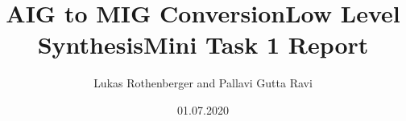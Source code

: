 \documentclass[
	accentcolor=1c,%
	type=intern,
	marginpar=false,
	ruledheaders=section,
	class=report,
	BCOR=5mm,
      parskip=half-,
	fontsize=10pt
	]{tudapub}
\begin{document}
	\title{AIG to MIG Conversion\newline Low Level Synthesis\newline Mini Task 1 Report \newline   }
	\author{Lukas Rothenberger and Pallavi Gutta Ravi}
	\date{01.07.2020} %




	\maketitle

	\tableofcontents

\end{document}

